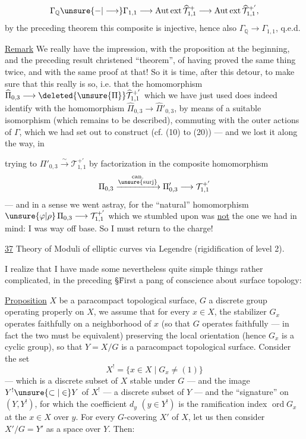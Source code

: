 
\[
\Gamma_{\mathbb Q}\unsure{-|\longrightarrow}\Gamma_{1,1}
\longrightarrow \operatorname{Aut\,ext}\widehat{\mathcal T}_{1,1}^{+}
\longrightarrow \operatorname{Aut\,ext}\widehat{\mathcal T}_{1,1}^{+'},
\]
by the preceding theorem this composite is injective, hence also
$\Gamma_{\mathbb Q}\longrightarrow\Gamma_{1,1}$, q.e.d.

\uline{Remark} We really have the impression, with the proposition at the beginning, and
the preceding result christened ``theorem'', of having proved
the same thing twice, and with the same proof
at that! So it is time, after this detour, to make sure that this
really is so, i.e. that the homomorphism
$\widehat{\Pi}_{0,3}\longrightarrow\deleted{\unsure{\Pi}}\widehat{\mathcal T}_{1,1}^{+'}$ which we have just used
does indeed identify with the homomorphism
$\widehat{\Pi}_{0,3}\longrightarrow\widehat{\Pi}'_{0,3}$,
by means of a suitable isomorphism (which remains to be described),
commuting with the outer actions of $\Gamma$,
which we had set out to construct (cf. (10) to (20)) --- and we
lost it along the way, in


trying to 
$\Pi'_{0,3}\xrightarrow{\sim}\mathcal T_{1,1}^{+'}$ by
factorization in the composite homomorphism
\[
\Pi_{0,3}\xrightarrow{\substack{\mathrm{can.}\\\unsure{\mathrm{surj}}}}
\Pi'_{0,3}\longrightarrow\mathcal T_{1,1}^{+'}
\]
--- and in a sense we went astray, for the ``natural'' homomorphism
$\unsure{\varphi|\rho}\,\Pi_{0,3}\longrightarrow\mathcal T_{1,1}^{+'}$
which we stumbled upon was \uline{not}  the one we had
in mind: I was way off base. So I must return to the charge!


\uline{37} Theory of Moduli of elliptic curves via Legendre
(rigidification of level 2). \unsure{)}

I realize that I have made some nevertheless quite simple things
rather complicated, in the preceding \S\. First a pang of conscience about surface topology:

\uline{Proposition} 
$X$ be a paracompact topological\unsure{${}^{*}$} surface,
$G$ a discrete group operating properly on $X$, we assume that for every
$x\in X$, the stabilizer $G_x$ operates faithfully on a neighborhood of $x$
(so that $G$ operates faithfully --- in fact the two must be
equivalent) preserving the local orientation (hence $G_x$ is
a cyclic group), so that $Y=X/G$ is a paracompact topological surface.
Consider the set
\[
X^{!}=\{x\in X\mid G_x\ne(1)\}
\]
--- which is a discrete subset of $X$ stable under $G$ --- and the image
$Y^{!}\unsure{\subset|\in}Y$ of $X^{!}$ --- a discrete subset of $Y$ --- and
the ``signature'' on $(Y,Y^{!})$, for which the coefficient $d_y$ $(y\in Y^{!})$
is the ramification index $\operatorname{ord}G_x$ at the
$x\in X$ over $y$. For every $G$-covering $X'$ of $X$, let us
then consider $X'/G=Y'$ as a space over $Y$. Then:

